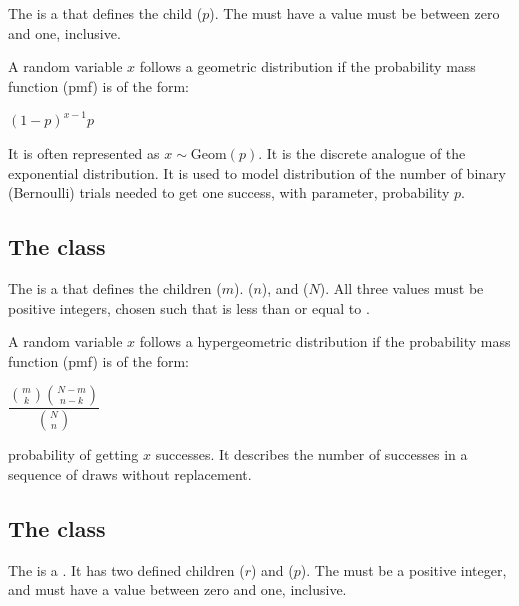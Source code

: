 The \GeometricDistribution is a \DiscreteUnivariateDistribution that defines the \UncertValue child  ($p$).  The  must have a value must be between zero and one, inclusive.

A random variable $ x $ follows a geometric distribution if the probability mass function (pmf) is of the form:

\begin{center}
$(1-p)^{x-1} p$
\end{center}

It is often represented as $x \sim \mathrm{Geom}(p)$. It is the discrete analogue of the exponential distribution. It is used to model distribution of the number of binary (Bernoulli) trials needed to get one success, with parameter, probability $p$.

\subsection{The  class}
\label{HypergeometricDistribution-class}
\label{hypergeometricdistribution-class}

The \HypergeometricDistribution is a \DiscreteUnivariateDistribution that defines the \UncertValue children  ($m$).  ($n$), and  ($N$).  All three values must be positive integers, chosen such that  is less than or equal to .

A random variable $ x $ follows a hypergeometric distribution if the probability mass function (pmf) is of the form:

\begin{center}
$\dfrac{ {m \choose k} { N-m \choose n-k } } { {N \choose n}}$
\end{center}

probability of getting $x$ successes.  It describes the number of successes in a sequence of draws without replacement.

\subsection{The  class}
\label{NegativeBinomialDistribution-class}
\label{negativebinomialdistribution-class}

The \NegativeBinomialDistribution is a \DiscreteUnivariateDistribution.  It has two defined \UncertValue children  ($r$) and  ($p$). The  must be a positive integer, and  must have a value between zero and one, inclusive.

